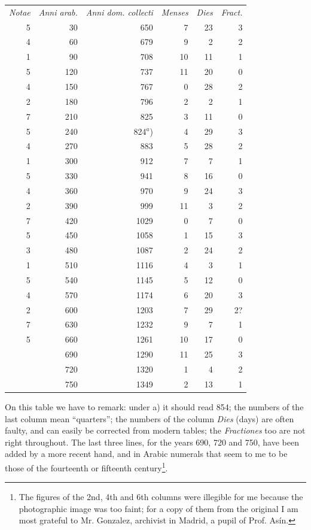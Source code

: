 \documentclass[11pt]{article}
\begin{document}
\begin{center}\small\begin{tabular}{rrrrrr}
\emph{Notae} & \emph{Anni arab.} & \emph{Anni dom. collecti} & \emph{Menses} & \emph{Dies} & \emph{Fract.} \\
5 & 30 & 650 & 7 & 23 & 3 \\
4 & 60 & 679 & 9 & 2 & 2 \\
1 & 90 & 708 & 10 & 11 & 1 \\
5 & 120 & 737 & 11 & 20 & 0 \\
4 & 150 & 767 & 0 & 28 & 2 \\
2 & 180 & 796 & 2 & 2 & 1 \\
7 & 210 & 825 & 3 & 11 & 0 \\
5 & 240 & 824$^{a}$) & 4 & 29 & 3 \\
4 & 270 & 883 & 5 & 28 & 2 \\
1 & 300 & 912 & 7 & 7 & 1 \\
5 & 330 & 941 & 8 & 16 & 0 \\
4 & 360 & 970 & 9 & 24 & 3 \\
2 & 390 & 999 & 11 & 3 & 2 \\
7 & 420 & 1029 & 0 & 7 & 0 \\
5 & 450 & 1058 & 1 & 15 & 3 \\
3 & 480 & 1087 & 2 & 24 & 2 \\
1 & 510 & 1116 & 4 & 3 & 1 \\
5 & 540 & 1145 & 5 & 12 & 0 \\
4 & 570 & 1174 & 6 & 20 & 3 \\
2 & 600 & 1203 & 7 & 29 & 2? \\
7 & 630 & 1232 & 9 & 7 & 1 \\
5 & 660 & 1261 & 10 & 17 & 0 \\
 & 690 & 1290 & 11 & 25 & 3 \\
 & 720 & 1320 & 1 & 4 & 2 \\
 & 750 & 1349 & 2 & 13 & 1 \\
\end{tabular}\end{center}
\par On this table we have to remark: under a) it should read 854; the numbers of the last column mean “quarters”; the numbers of the column \emph{Dies} (days) are often faulty, and can easily be corrected from modern tables; the \emph{Fractiones} too are not right throughout. The last three lines, for the years 690, 720 and 750, have been added by a more recent hand, and in Arabic numerals that seem to me to be those of the fourteenth or fifteenth century\footnote{The figures of the 2nd, 4th and 6th columns were illegible for me because the photographic image was too faint; for a copy of them from the original I am most grateful to Mr. Gonzalez, archivist in Madrid, a pupil of Prof. Asín.}.\par
\end{document}
